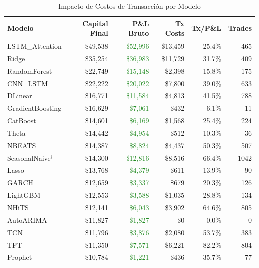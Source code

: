 \begin{table}[H]
\centering
\caption{Impacto de Costos de Transacci\'on por Modelo}
\label{tab:cost_breakdown}
\small
\begin{tabular}{@{}lrrrrr@{}}
\toprule
\textbf{Modelo} & \textbf{Capital Final} & \textbf{P\&L Bruto} & \textbf{Tx Costs} & \textbf{Tx/P\&L} & \textbf{Trades} \\
\midrule
LSTM\_Attention & \$49,538 & \textcolor{ForestGreen}{\$52,996} & \$13,459 & 25.4\% & 465 \\
Ridge & \$35,254 & \textcolor{ForestGreen}{\$36,983} & \$11,729 & 31.7\% & 409 \\
RandomForest & \$22,749 & \textcolor{ForestGreen}{\$15,148} & \$2,398 & 15.8\% & 175 \\
CNN\_LSTM & \$22,222 & \textcolor{ForestGreen}{\$20,022} & \$7,800 & 39.0\% & 633 \\
DLinear & \$16,771 & \textcolor{ForestGreen}{\$11,584} & \$4,813 & 41.5\% & 788 \\
GradientBoosting & \$16,629 & \textcolor{ForestGreen}{\$7,061} & \$432 & 6.1\% & 11 \\
CatBoost & \$14,601 & \textcolor{ForestGreen}{\$6,169} & \$1,568 & 25.4\% & 224 \\
Theta & \$14,442 & \textcolor{ForestGreen}{\$4,954} & \$512 & 10.3\% & 36 \\
NBEATS & \$14,387 & \textcolor{ForestGreen}{\$8,824} & \$4,437 & 50.3\% & 507 \\
\rowcolor{naivebg} SeasonalNaive$^\dagger$ & \$14,300 & \textcolor{ForestGreen}{\$12,816} & \$8,516 & 66.4\% & 1042 \\
Lasso & \$13,768 & \textcolor{ForestGreen}{\$4,379} & \$611 & 13.9\% & 90 \\
GARCH & \$12,659 & \textcolor{ForestGreen}{\$3,337} & \$679 & 20.3\% & 126 \\
LightGBM & \$12,553 & \textcolor{ForestGreen}{\$3,588} & \$1,035 & 28.8\% & 134 \\
NHiTS & \$12,141 & \textcolor{ForestGreen}{\$6,043} & \$3,902 & 64.6\% & 805 \\
AutoARIMA & \$11,827 & \textcolor{ForestGreen}{\$1,827} & \$0 & 0.0\% & 0 \\
TCN & \$11,796 & \textcolor{ForestGreen}{\$3,876} & \$2,080 & 53.7\% & 383 \\
TFT & \$11,350 & \textcolor{ForestGreen}{\$7,571} & \$6,221 & 82.2\% & 804 \\
Prophet & \$10,784 & \textcolor{ForestGreen}{\$1,221} & \$436 & 35.7\% & 77 \\

\end{tabular}
\end{table}
